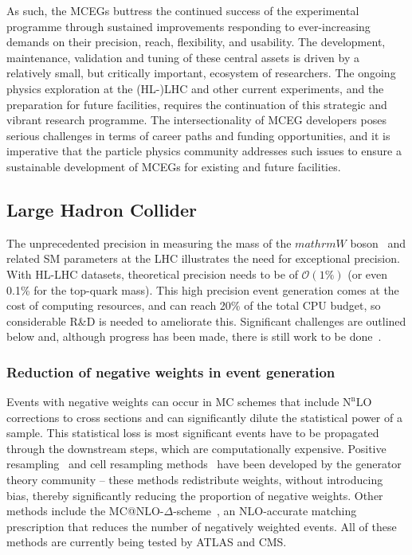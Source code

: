 \documentclass[10pt,a4paper]{article}
\begin{document}
As such, the MCEGs buttress the continued success of the experimental programme
through sustained improvements responding to ever-increasing demands on their
precision, reach, flexibility, and usability. The development, maintenance,
validation and tuning of these central assets is driven by a relatively small,
but critically important, ecosystem of researchers. The ongoing physics
exploration at the (HL-)LHC and other current experiments, and the preparation
for future facilities, requires the continuation of this strategic and vibrant
research programme. The intersectionality of MCEG developers poses serious
challenges in terms of career paths and funding opportunities, and it is
imperative that the particle physics community addresses such issues to ensure a
sustainable development of MCEGs for existing and future facilities.

\subsection{Large Hadron Collider}\label{large-hadron-collider}

The unprecedented precision in measuring the mass of the $mathrm{W}$
boson~\cite{CMS:2024lrd} and related SM parameters at the LHC illustrates the
need for exceptional precision. With HL-LHC datasets, theoretical precision
needs to be of $\mathcal{O}(1\%)$ (or even 0.1\% for the top-quark mass). This
high precision event generation comes at the cost of computing resources, and
can reach 20\% of the total CPU budget, so considerable R\&D is needed to
ameliorate this. Significant challenges are outlined below and, although
progress has been made, there is still work to be
done~\cite{HSFPhysicsEventGeneratorWG:2020gxw,maltoni2022tf07snowmassreporttheory,10.21468/SciPostPhys.16.5.130}.

\subsubsection{Reduction of negative weights in event
generation}\label{reduction-of-negative-weights-in-event-generation}

Events with negative weights can occur in MC schemes that include
$\mathrm{N}^\mathrm{n}\mathrm{LO}$ corrections to cross sections and can
significantly dilute the statistical power of a sample. This statistical loss is
most significant events have to be propagated through the downstream steps,
which are computationally expensive. Positive resampling~\cite{Andersen:2020sjs}
and cell resampling methods~\cite{Andersen:2021mvw} have been developed by the
generator theory community -- these methods redistribute weights, without
introducing bias, thereby significantly reducing the proportion of negative
weights. Other methods include the
MC@NLO-$\Delta$-scheme~\cite{Frederix:2020trv}, an NLO-accurate matching
prescription that reduces the number of negatively weighted events. All of these
methods are currently being tested by ATLAS and CMS.
\end{document}
